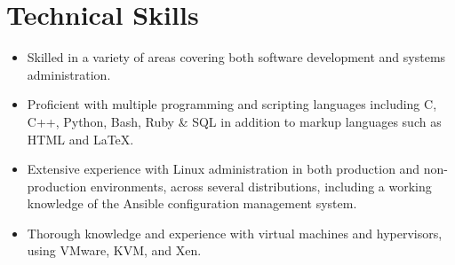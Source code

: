 \documentclass[10pt,letterpaper]{article} %
\begin{document}
    \section*{Technical Skills} 
        \begin{itemize}
        \item Skilled in a variety of areas covering both software development and systems administration. 
        \item Proficient with multiple programming and scripting languages including C, C++, Python, Bash, Ruby \& SQL in addition to markup languages such as HTML and \LaTeX.
        \item Extensive experience with Linux administration in both production and non-production environments, across several distributions, 
        including a working knowledge of the Ansible configuration management system.
        \item Thorough knowledge and experience with virtual machines and hypervisors, using VMware, KVM, and Xen. 
        \end{itemize}          
\end{document}
